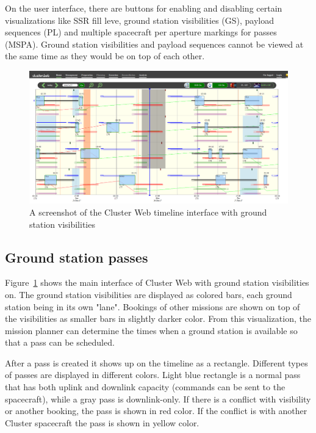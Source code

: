 On the user interface, there are buttons for enabling and disabling certain visualizations like SSR fill leve, ground station visibilities (GS), payload sequences (PL) and multiple spacecraft per aperture markings for passes (MSPA). Ground station visibilities and payload sequences cannot be viewed at the same time as they would be on top of each other.

\begin{figure}[ht]
  \begin{center}
    \includegraphics*[width=1\textwidth]{clusterweb_visibilities}
  \end{center}
  \caption{A screenshot of the Cluster Web timeline interface with ground station visibilities}
  \label{fig:clusterweb_visibilities}
\end{figure}

\subsection{Ground station passes}
Figure~\ref{fig:clusterweb_visibilities} shows the main interface of Cluster Web with ground station visibilities on. The ground station visibilities are displayed as colored bars, each ground station being in its own "lane". Bookings of other missions are shown on top of the visibilities as smaller bars in slightly darker color. From this visualization, the mission planner can determine the times when a ground station is available so that a pass can be scheduled. 

After a pass is created it shows up on the timeline as a rectangle. Different types of passes are displayed in different colors. Light blue rectangle is a normal pass that has both uplink and downlink capacity (commands can be sent to the spacecraft), while a gray pass is downlink-only. If there is a conflict with visibility or another booking, the pass is shown in red color. If the conflict is with another Cluster spacecraft the pass is shown in yellow color.

